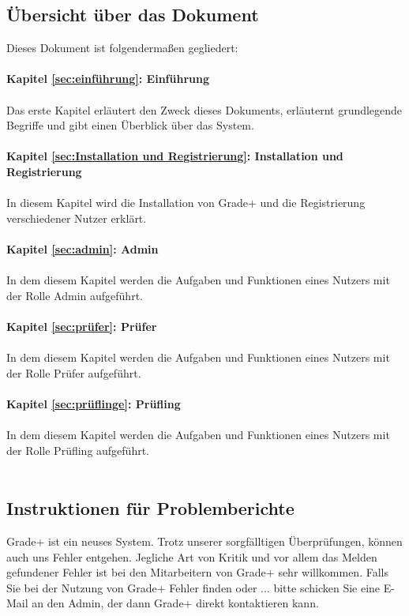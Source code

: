 \subsection{Übersicht über das Dokument}
Dieses Dokument ist folgendermaßen gegliedert:\\
\\
\textbf{Kapitel \ref{sec:einführung}: Einführung} %
\\
\\
Das erste Kapitel erläutert den Zweck dieses Dokuments, erläuternt grundlegende Begriffe und gibt einen Überblick über das System.
\\
\\

\textbf{Kapitel \ref{sec:Installation und Registrierung}: Installation und Registrierung} %
\\
\\
{ In diesem Kapitel wird die Installation von Grade+  und die Registrierung verschiedener Nutzer erklärt.}
\\
\\

\textbf{Kapitel \ref{sec:admin}: Admin} %
\\
\\
{In dem diesem Kapitel werden die Aufgaben und Funktionen eines Nutzers mit der Rolle Admin aufgeführt.}
\\
\\

\textbf{Kapitel \ref{sec:prüfer}: Prüfer} %
\\
\\
{In dem diesem Kapitel werden die Aufgaben und Funktionen eines Nutzers mit der Rolle Prüfer aufgeführt.}
\\
\\

\textbf{Kapitel \ref{sec:prüflinge}: Prüfling} %
\\
\\
{In dem diesem Kapitel werden die Aufgaben und Funktionen eines Nutzers mit der Rolle Prüfling aufgeführt.}
\\
\\
\subsection{Instruktionen für Problemberichte}
Grade+ ist ein neuses System.
Trotz unserer sorgfälltigen Überprüfungen, können auch uns Fehler entgehen.
Jegliche Art von Kritik und vor allem das Melden gefundener Fehler ist bei den Mitarbeitern von Grade+ sehr willkommen.
Falls Sie bei der Nutzung von Grade+ Fehler finden oder ... bitte schicken Sie eine E-Mail an den Admin, der dann Grade+ direkt kontaktieren kann.